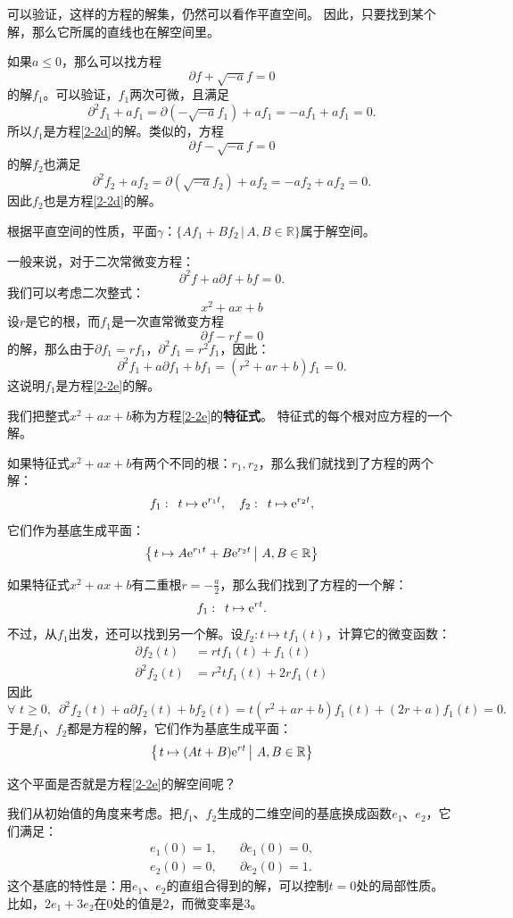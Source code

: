 \documentclass[12pt,UTF8,fontset=none]{ctexbook}
\begin{document}
可以验证，这样的方程的解集，仍然可以看作平直空间。
因此，只要找到某个解，那么它所属的直线也在解空间里。

如果$a\leqslant 0$，那么可以找方程
$$ \partial f + \sqrt{-a} f = 0 $$
的解$f_1$。可以验证，$f_1$两次可微，且满足
$$ \partial^2 f_1 + a f_1 = \partial (- \sqrt{-a} f_1) + af_1 = -af_1 + af_1 = 0. $$
所以$f_1$是方程\eqref{2-2d}的解。类似的，方程
$$ \partial f - \sqrt{-a} f = 0 $$
的解$f_2$也满足
$$ \partial^2 f_2 + a f_2 = \partial (\sqrt{-a} f_2) + af_2 = -af_2 + af_2 = 0. $$
因此$f_2$也是方程\eqref{2-2d}的解。

根据平直空间的性质，平面$\gamma$：$\{Af_1 + Bf_2 \, | \, A, B\in\mathbb{R}\}$属于解空间。

一般来说，对于二次常微变方程：
\begin{equation}
    \partial^2 f + a \partial f + b f = 0. \label{2-2e}
\end{equation}
我们可以考虑二次整式：
$$ x^2 + ax + b$$
设$r$是它的根，而$f_1$是一次直常微变方程
$$ \partial f - r f = 0 $$
的解，那么由于$\partial f_1 = rf_1 $，$\partial^2 f_1 = r^2f_1 $，因此：
$$ \partial^2 f_1 + a \partial f_1 + b f_1 = (r^2 + ar + b)f_1 = 0.$$
这说明$f_1$是方程\eqref{2-2e}的解。

我们把整式$ x^2 + ax + b$称为方程\eqref{2-2e}的\textbf{特征式}。
特征式的每个根对应方程的一个解。

如果特征式$x^2 + ax + b$有两个不同的根：$r_1, r_2$，那么我们就找到了方程的两个解：
$$ f_1:\,\,\, t \mapsto \mathrm{e}^{r_1t}, \quad f_2:\,\,\, t \mapsto \mathrm{e}^{r_2t}, $$
它们作为基底生成平面：
$$ \left\{\left.t \mapsto A\mathrm{e}^{r_1t} + B\mathrm{e}^{r_2t}\,\right|\, A, B \in \mathbb{R}\right\}$$

如果特征式$x^2 + ax + b$有二重根$r = -\frac{a}{2}$，那么我们找到了方程的一个解：
$$ f_1:\,\,\, t \mapsto \mathrm{e}^{rt}. $$
不过，从$f_1$出发，还可以找到另一个解。设$f_2: t\mapsto tf_1(t)$，计算它的微变函数：
\begin{align*}
    \partial f_2(t) &= rt f_1(t) + f_1(t) \\
    \partial^2 f_2(t) &= r^2 t f_1(t) + 2r f_1(t)
\end{align*}
因此
$$ \forall\,\, t \geqslant 0,\,\,\,\partial^2 f_2(t) + a \partial f_2(t) + b f_2(t) = t(r^2 + ar + b)f_1(t) + (2r + a)f_1(t) = 0.$$
于是$f_1$、$f_2$都是方程的解，它们作为基底生成平面：
$$ \left\{\left.t \mapsto (At + B)\mathrm{e}^{rt}\,\right|\, A, B \in \mathbb{R}\right\}$$

这个平面是否就是方程\eqref{2-2e}的解空间呢？

我们从初始值的角度来考虑。把$f_1$、$f_2$生成的二维空间的基底换成函数$e_1$、$e_2$，它们满足：
$$
\begin{array}{ll}
    e_1(0) = 1, &\quad \partial e_1(0) = 0, \\
    e_2(0) = 0, &\quad \partial e_2(0) = 1.
\end{array}
$$
这个基底的特性是：用$e_1$、$e_2$的直组合得到的解，可以控制$t = 0$处的局部性质。
比如，$2e_1 + 3e_2$在$0$处的值是$2$，而微变率是$3$。
\end{document}
